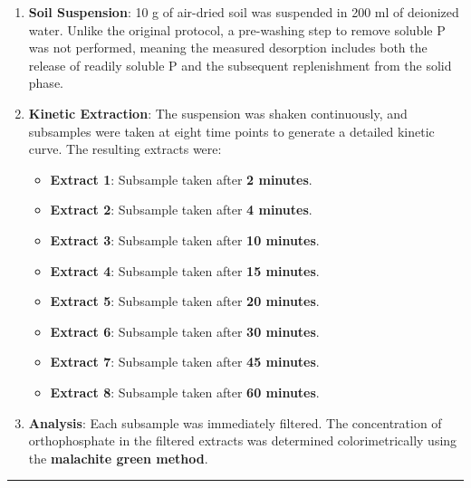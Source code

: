 \documentclass[
  a4paper,
]{article}
\providecommand{\tightlist}{%
  \setlength{\itemsep}{0pt}\setlength{\parskip}{0pt}}
\begin{document}
\begin{enumerate}
\def\labelenumi{\arabic{enumi}.}
\item
  \textbf{Soil Suspension}: 10 g of air-dried soil was suspended in 200
  ml of deionized water. Unlike the original protocol, a pre-washing
  step to remove soluble P was not performed, meaning the measured
  desorption includes both the release of readily soluble P and the
  subsequent replenishment from the solid phase.
\item
  \textbf{Kinetic Extraction}: The suspension was shaken continuously,
  and subsamples were taken at eight time points to generate a detailed
  kinetic curve. The resulting extracts were:

  \begin{itemize}
  \tightlist
  \item
    \textbf{Extract 1}: Subsample taken after \textbf{2 minutes}.
  \item
    \textbf{Extract 2}: Subsample taken after \textbf{4 minutes}.
  \item
    \textbf{Extract 3}: Subsample taken after \textbf{10 minutes}.
  \item
    \textbf{Extract 4}: Subsample taken after \textbf{15 minutes}.
  \item
    \textbf{Extract 5}: Subsample taken after \textbf{20 minutes}.
  \item
    \textbf{Extract 6}: Subsample taken after \textbf{30 minutes}.
  \item
    \textbf{Extract 7}: Subsample taken after \textbf{45 minutes}.
  \item
    \textbf{Extract 8}: Subsample taken after \textbf{60 minutes}.
  \end{itemize}
\item
  \textbf{Analysis}: Each subsample was immediately filtered. The
  concentration of orthophosphate in the filtered extracts was
  determined colorimetrically using the \textbf{malachite green method}.
\end{enumerate}

\begin{center}\rule{0.5\linewidth}{0.5pt}\end{center}
\end{document}

